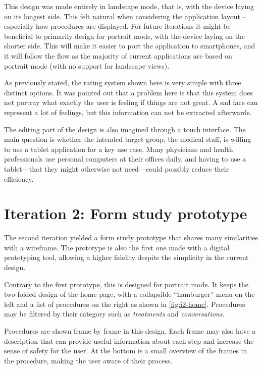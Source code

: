 This design was made entirely in landscape mode, that is, with the device laying on its longest side. This felt natural when considering the application layout -- especially how procedures are displayed. For future iterations it might be beneficial to primarily design for portrait mode, with the device laying on the shorter side. This will make it easier to port the application to smartphones, and it will follow the flow as the majority of current applications are based on portrait mode (with no support for landscape views).

As previously stated, the rating system shown here is very simple with three distinct options. It was pointed out that a problem here is that this system does not portray what exactly the user is feeling if things are not great. A sad face can represent a lot of feelings, but this information can not be extracted afterwards.

The editing part of the design is also imagined through a touch interface. The main question is whether the intended target group, the medical staff, is willing to use a tablet application for a key use case. Many physicians and health professionals use personal computers at their offices daily, and having to use a tablet---that they might otherwise not need---could possibly reduce their efficiency.

\section{Iteration 2: Form study prototype}
\label{sec:iteration2}

The second iteration yielded a form study prototype that shares many similarities with a wireframe. The prototype is also the first one made with a digital prototyping tool, allowing a higher fidelity despite the simplicity in the current design.

Contrary to the first prototype, this is designed for portrait mode. It keeps the two-folded design of the home page, with a collapsible \enquote{hamburger} menu on the left and a list of procedures on the right as shown in \autoref{fig:i2-home}. Procedures may be filtered by their category such as \emph{treatments} and \emph{conversations}.

Procedures are shown frame by frame in this design. Each frame may also have a description that can provide useful information about each step and increase the sense of safety for the user. At the bottom is a small overview of the frames in the procedure, making the user aware of their process.

